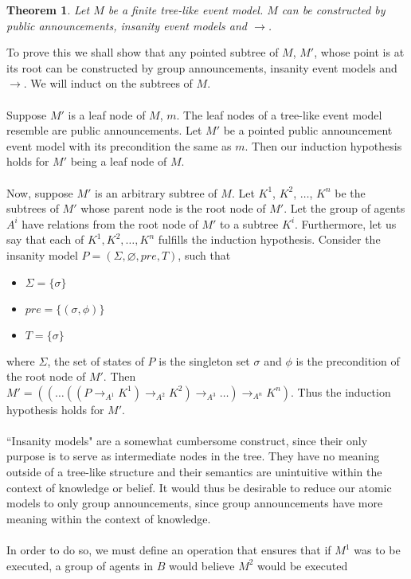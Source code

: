 \documentclass[12pt, a4paper, titlepage]{scrartcl}
\newtheorem{thm}{Theorem}
\begin{document}
\begin{thm}
Let $M$ be a finite tree-like event model.
$M$ can be constructed by public announcements, insanity event models and $\to$.
\end{thm}
To prove this we shall show that any pointed subtree of $M$, $M'$, whose point
is at its root can be constructed by group announcements, insanity event models
and $\to$.
We will induct on the subtrees of $M$.\\
\\
Suppose $M'$ is a leaf node of $M$, $m$.
The leaf nodes of a tree-like event model resemble are public announcements.
Let $M'$ be a pointed public announcement event model with its precondition the
same as $m$.
Then our induction hypothesis holds for $M'$ being a leaf node of $M$.\\
\\
Now, suppose $M'$ is an arbitrary subtree of $M$.
Let $K^1$, $K^2$, $\ldots$, $K^n$ be the subtrees of $M'$ whose parent node is
the root node of $M'$.
Let the group of agents $A^i$ have relations from the root node of $M'$ to a
subtree $K^i$.
Furthermore, let us say that each of $K^1, K^2, \ldots, K^n$ fulfills the
induction hypothesis.
Consider the insanity model $P = (\Sigma,\varnothing,pre,T)$, such that
\begin{itemize}
  \item $\Sigma = \{ \sigma \}$
  \item $pre = \{ (\sigma, \phi)\}$
  \item $T = \{\sigma\}$
\end{itemize}
where $\Sigma$, the set of states of $P$ is the singleton set $\sigma$ and 
$\phi$ is the precondition of the root node of $M'$.
Then $M' = ((\ldots((P \to_{A^1} K^1) \to_{A^2} K^2) \to_{A^3} \ldots)\to_{A^n} K^n)$.
Thus the induction hypothesis holds for $M'$.\\
\\
``Insanity models" are a somewhat cumbersome construct, since their only purpose
is to serve as intermediate nodes in the tree.
They have no meaning outside of a tree-like structure and their semantics are
unintuitive within the context of knowledge or belief.
It would thus be desirable to reduce our atomic models to only group
announcements, since group announcements have more meaning within the context of
knowledge.\\
\\
In order to do so, we must define an operation that ensures that if $M^1$ was to
be executed, a group of agents in $B$ would believe $M^2$ would be executed
\end{document}
